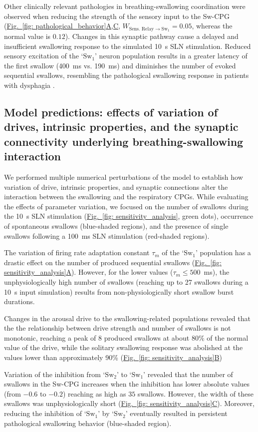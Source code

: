 \documentclass[pdflatex,sn-mathphys-ay]{sn-jnl}%
\renewcommand{\figureautorefname}{Fig.}
\newcommand{\Figref}[2][]{\hyperref[#2]{\figureautorefname~\ref*{#2}#1}}
\theoremstyle{thmstyleone}%
\theoremstyle{thmstyletwo}%
\theoremstyle{thmstylethree}%
\begin{document}
Other clinically relevant pathologies in breathing-swallowing coordination were observed when reducing the strength of the sensory input to the Sw-CPG (\Figref[A,C]{fig: pathological_behavior}, $W_{\text{Sens. Relay} \to \text{Sw}_1} = 0.05$, whereas the normal value is $0.12$). Changes in this synaptic pathway cause a delayed and insufficient swallowing response to the simulated 10~s SLN stimulation. Reduced sensory excitation of the `$\text{Sw}_1$' neuron population results in a greater latency of the first swallow (400~ms vs. 190~ms) and diminishes the number of evoked sequential swallows, resembling the pathological swallowing response in patients with dysphagia \citep{daniels1997role}.

\subsection{Model predictions: effects of variation of drives, intrinsic properties, and the synaptic connectivity underlying breathing-swallowing interaction}
We performed multiple numerical perturbations of the model to establish how variation of drive, intrinsic properties, and synaptic connections alter the interaction between the swallowing and the respiratory CPGs. While evaluating the effects of parameter variation, we focused on the number of swallows during the 10~s SLN stimulation (\Figref[]{fig: sensitivity_analysis}, green dots), occurrence of spontaneous swallows (blue-shaded regions), and the presence of single swallows following a 100~ms SLN stimulation (red-shaded regions).

The variation of firing rate adaptation constant $\tau_m$ of the `$\text{Sw}_1$' population has a drastic effect on the number of produced sequential swallows (\Figref[A]{fig: sensitivity_analysis}). However, for the lower values ($\tau_m \leq 500$~ms), the unphysiologically high number of swallows (reaching up to 27 swallows during a 10~s input simulation) results from non-physiologically short swallow burst durations.

Changes in the arousal drive to the swallowing-related populations revealed that the the relationship between drive strength and number of swallows is not monotonic, reaching a peak of 8 produced swallows at about 80\% of the normal value of the drive, while the solitary swallowing response was abolished at the values lower than approximately 90\% (\Figref[B]{fig: sensitivity_analysis})

Variation of the inhibition from `$\text{Sw}_2$' to `$\text{Sw}_1$' revealed that the number of swallows in the Sw-CPG increases when the inhibition has lower absolute values (from $-0.6$ to $-0.2$) reaching as high as $35$ swallows. However, the width of these swallows was unphysiologically short (\Figref[C]{fig: sensitivity_analysis}). Moreover, reducing the inhibition of `$\text{Sw}_1$' by `$\text{Sw}_2$' eventually resulted in persistent pathological swallowing behavior (blue-shaded region).
\end{document}
